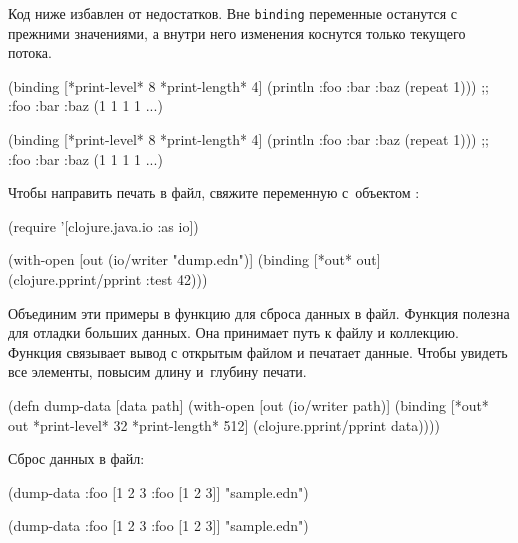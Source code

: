 Код ниже избавлен от недостатков. Вне \texttt{bin\-ding} переменные останутся с
прежними значениями, а внутри него изменения коснутся только текущего потока.

\ifnarrow

\begin{clojure}
(binding [*print-level* 8
          *print-length* 4]
  (println
    {:foo {:bar {:baz (repeat 1)}}}))
;; {:foo {:bar {:baz (1 1 1 1 ...)}}}
\end{clojure}

\else

\begin{clojure}
(binding [*print-level* 8
          *print-length* 4]
  (println {:foo {:bar {:baz (repeat 1)}}}))
;; {:foo {:bar {:baz (1 1 1 1 ...)}}}
\end{clojure}

\fi


Чтобы направить печать в файл, свяжите переменную  с~объектом
:

\begin{clojure}
(require '[clojure.java.io :as io])

(with-open [out (io/writer "dump.edn")]
  (binding [*out* out]
    (clojure.pprint/pprint {:test 42})))
\end{clojure}

Объединим эти примеры в функцию для сброса данных в файл. Функция полезна для
отладки больших данных. Она принимает путь к файлу и коллекцию. Функция
связывает вывод с открытым файлом и печатает данные. Чтобы увидеть все элементы,
повысим длину и~глубину печати.

\begin{clojure}
(defn dump-data
  [data path]
  (with-open [out (io/writer path)]
    (binding [*out* out
              *print-level* 32
              *print-length* 512]
      (clojure.pprint/pprint data))))
\end{clojure}

\noindent
Сброс данных в файл:

\ifnarrow

\begin{clojure}
(dump-data
  {:foo [1 2 3 {:foo [1 2 3]}]}
  "sample.edn")
\end{clojure}

\else

\begin{clojure}
(dump-data {:foo [1 2 3 {:foo [1 2 3]}]} "sample.edn")
\end{clojure}

